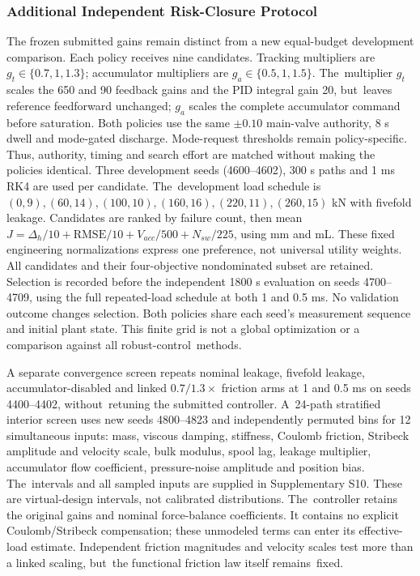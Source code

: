 \documentclass[machines,article,submit,pdftex,moreauthors]{Definitions/mdpi}
\begin{document}
\subsubsection{Additional Independent Risk-Closure Protocol}
The frozen submitted gains remain distinct from a new equal-budget development comparison. Each policy receives nine candidates. Tracking multipliers are $g_t\in\{0.7,1,1.3\}$; accumulator multipliers are $g_a\in\{0.5,1,1.5\}$. The~multiplier $g_t$ scales the 650 and 90 feedback gains and the PID integral gain 20, but~leaves reference feedforward unchanged; $g_a$ scales the complete accumulator command before saturation. Both policies use the same $\pm0.10$ main-valve authority, 8 s dwell and mode-gated discharge. Mode-request thresholds remain policy-specific. Thus, authority, timing and search effort are matched without making the policies identical. Three development seeds (4600--4602), 300 s paths and 1 ms RK4 are used per candidate. The~development load schedule is $(0,9),(60,14),(100,10),(160,16),(220,11),(260,15)$ kN with fivefold leakage. Candidates are ranked by failure count, then mean $J=\Delta_h/10+\mathrm{RMSE}/10+V_{acc}/500+N_{sw}/225$, using mm and mL. These fixed engineering normalizations express one preference, not universal utility weights. All candidates and their four-objective nondominated subset are retained. Selection is recorded before the independent 1800 s evaluation on seeds 4700--4709, using the full repeated-load schedule at both 1 and 0.5 ms. No validation outcome changes selection. Both policies share each seed's measurement sequence and initial plant state. This finite grid is not a global optimization or a comparison against all robust-control~methods.

A separate convergence screen repeats nominal leakage, fivefold leakage, accumulator-disabled and linked $0.7/1.3\times$ friction arms at 1 and 0.5 ms on seeds 4400--4402, without~retuning the submitted controller. A~24-path stratified interior screen uses new seeds \mbox{4800--4823} and independently permuted bins for 12 simultaneous inputs: mass, viscous damping, stiffness, Coulomb friction, Stribeck amplitude and velocity scale, bulk modulus, spool lag, leakage multiplier, accumulator flow coefficient, pressure-noise amplitude and position bias. The~intervals and all sampled inputs are supplied in Supplementary S10. These are virtual-design intervals, not calibrated distributions. The~controller retains the original gains and nominal force-balance coefficients. It contains no explicit Coulomb/Stribeck compensation; these unmodeled terms can enter its effective-load estimate. Independent friction magnitudes and velocity scales test more than a linked scaling, but~the functional friction law itself remains~fixed.
\end{document}
